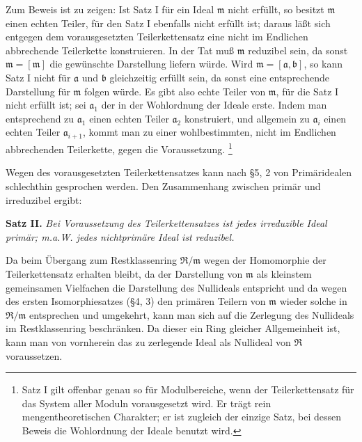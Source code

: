 \documentclass[11pt]{article}
\providecommand{\mR}{\mathfrak{R}}
\providecommand{\ma}{\mathfrak{a}}
\providecommand{\mb}{\mathfrak{b}}
\providecommand{\mm}{\mathfrak{m}}
\begin{document}
Zum Beweis ist zu zeigen: Ist Satz I für ein Ideal $\mm$ nicht erfüllt, so besitzt $\mm$ einen echten Teiler, für den Satz I ebenfalls nicht erfüllt ist; daraus läßt sich entgegen dem vorausgesetzten Teilerkettensatz eine nicht im Endlichen abbrechende Teilerkette konstruieren. In der Tat muß $\mm$ reduzibel sein, da sonst $\mm=[\mm]$ die gewünschte Darstellung liefern würde. Wird $\mm=[\ma,\mb]$, so kann Satz I nicht für $\ma$ und $\mb$ gleichzeitig erfüllt sein, da sonst eine entsprechende Darstellung für $\mm$ folgen würde. Es gibt also echte Teiler von $\mm$, für die Satz I nicht erfüllt ist; sei $\ma_1$ der in der Wohlordnung der Ideale erste. Indem man entsprechend zu $\ma_1$ einen echten Teiler $\ma_2$ konstruiert, und allgemein zu $\ma_i$ einen echten Teiler $\ma_{i+1}$, kommt man zu einer wohlbestimmten, nicht im Endlichen abbrechenden Teilerkette, gegen die Voraussetzung.
\footnote{Satz I gilt offenbar genau so für Modulbereiche, wenn der Teilerkettensatz für das System aller Moduln vorausgesetzt wird. Er trägt rein mengentheoretischen Charakter; er ist zugleich der einzige Satz, bei dessen Beweis die Wohlordnung der Ideale benutzt wird.}

Wegen des vorausgesetzten Teilerkettensatzes kann nach §5, 2 von Primäridealen schlechthin gesprochen werden. Den Zusammenhang zwischen primär und irreduzibel ergibt:

\textbf{Satz II.} \emph{Bei Voraussetzung des Teilerkettensatzes ist jedes irreduzible Ideal primär; m.a.W. jedes nichtprimäre Ideal ist reduzibel.}

Da beim Übergang zum Restklassenring $\mR/\mm$ wegen der Homomorphie der Teilerkettensatz erhalten bleibt, da der Darstellung von $\mm$ als kleinstem gemeinsamen Vielfachen die Darstellung des Nullideals entspricht und da wegen des ersten Isomorphiesatzes (§4, 3) den primären Teilern von $\mm$ wieder solche in $\mR/\mm$ entsprechen und umgekehrt, kann man sich auf die Zerlegung des Nullideals im Restklassenring beschränken. Da dieser ein Ring gleicher Allgemeinheit ist, kann man von vornherein das zu zerlegende Ideal als Nullideal von $\mR$ voraussetzen.
\end{document}

